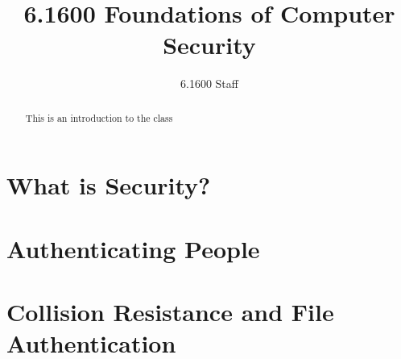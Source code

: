 \documentclass[
letterpaper, %
11pt, %
onecolumn, %
oneside
]{memoir}
\author{6.1600 Staff}
\title{6.1600 Foundations of Computer Security}
\begin{document}
\frontmatter

\maketitle

\begin{abstract}
	This is an introduction to the class
\end{abstract}
\clearpage

\tableofcontents*
\clearpage

\mainmatter

\chapter{What is Security?}



\chapter{Authenticating People}



\chapter{Collision Resistance and File Authentication}



\backmatter


% 
% 
\end{document}
